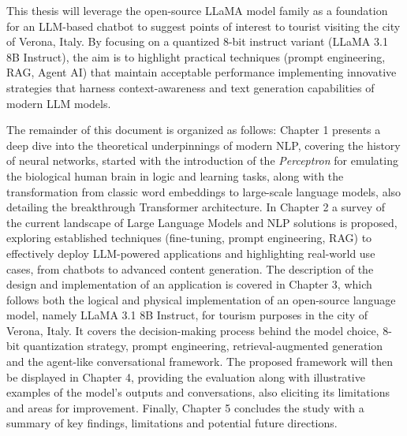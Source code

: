 This thesis will leverage the open-source LLaMA model family as a foundation for an LLM-based chatbot to suggest points of interest to tourist visiting the city of Verona, Italy. By focusing on a quantized 8-bit instruct variant (LLaMA 3.1 8B Instruct), the aim is to highlight practical techniques (prompt engineering, RAG, Agent AI) that maintain acceptable performance implementing innovative strategies that harness context-awareness and text generation capabilities of modern LLM models.


The remainder of this document is organized as follows: Chapter 1 presents a deep dive into the theoretical underpinnings of modern NLP, covering the history of neural networks, started with the introduction of the \textit{Perceptron} \cite{rosenblatt1958perceptron} for emulating the biological human brain in logic and learning tasks, along with the transformation from classic word embeddings to large-scale language models, also detailing the breakthrough Transformer architecture.
In Chapter 2 a survey of the current landscape of Large Language Models and NLP solutions is proposed, exploring established techniques (fine-tuning, prompt engineering, RAG) to effectively deploy LLM-powered applications and highlighting real-world use cases, from chatbots to advanced content generation.
The description of the design and implementation of an application is covered in Chapter 3, which follows both the logical and physical implementation of an open-source language model, namely LLaMA 3.1 8B Instruct, for tourism purposes in the city of Verona, Italy. It covers the decision-making process behind the model choice, 8-bit quantization strategy, prompt engineering, retrieval-augmented generation and the agent-like conversational framework. The proposed framework will then be displayed in Chapter 4, providing the evaluation along with illustrative examples of the model’s outputs and conversations, also eliciting its limitations and areas for improvement.
Finally, Chapter 5 concludes the study with a summary of key findings, limitations and potential future directions.